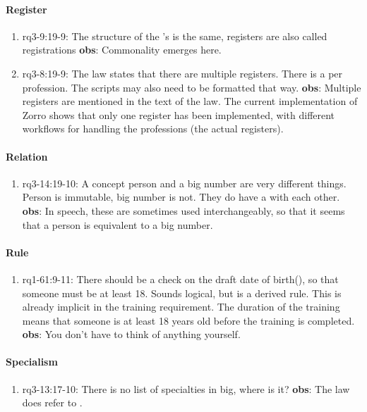 \paragraph{Register}
\begin{enumerate}
    \item rq3-9:19-9: The structure of the 's is the same, registers are also called registrations
    \newline\textbf{obs}: Commonality emerges here.

    \item rq3-8:19-9: The law states that there are multiple registers.
    There is a  per profession.
    The scripts may also need to be formatted that way.
    \newline\textbf{obs}: Multiple registers are mentioned in the text of the law.
    The current implementation of Zorro shows that only one register has been implemented, with different workflows for handling the professions (the actual registers).

\end{enumerate}

\paragraph{Relation}
\begin{enumerate}
    \item rq3-14:19-10: A {concept} person and a big number are very different things.
    Person is immutable, big number is not.
    They do have a  with each other.
    \newline\textbf{obs}: In speech, these are sometimes used interchangeably, so that it seems that a person is equivalent to a big number.

\end{enumerate}

\paragraph{Rule}
\begin{enumerate}
    \item rq1-61:9-11: There should be a check on the draft date of birth(), so that someone must be at least 18.
    Sounds logical, but is a derived rule.
    This is already implicit in the training requirement.
    The duration of the training means that someone is at least 18 years old before the training is completed.
    \newline\textbf{obs}: You don't have to think of anything yourself.

\end{enumerate}

\paragraph{Specialism}
\begin{enumerate}
    \item rq3-13:17-10: There is no list of specialties in \acrshort{big}, where is it?
    \newline\textbf{obs}: The law does refer to .

\end{enumerate}



\newpage

